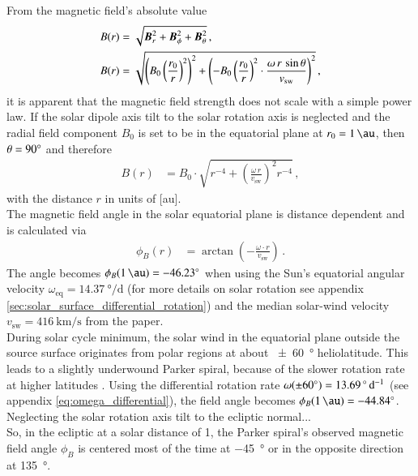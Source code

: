From the magnetic field's absolute value
\begin{align}
	B(r) &= \sqrt{\boldsymbol{B}_r^2 + \boldsymbol{B}_\phi^2 + \boldsymbol{B}_\theta^2}\,,	\label{eq:B_absolute}\\
	B(r) &= \sqrt{\left(B_0 \left(\frac{r_0}{r}\right)^2\right)^2 + \left(-B_0 \left(\frac{r_0}{r}\right)^2 \cdot \frac{\omega\,r\,\sin\theta}{v_\text{sw}}\right)^2}\,,
\end{align}
it is apparent that the magnetic field strength does not scale with a simple power law. If the solar dipole axis tilt to the solar rotation axis is neglected and the radial field component $B_0$ is set to be in the equatorial plane at $r_0 = \SI{1}{\au}$, then $\theta = 90\degree$ and therefore
\begin{align}
	B(r) &= B_0 \cdot \sqrt{r^{-4} + \left(\frac{\omega\,r}{v_\text{sw}}\right)^2 r^{-4}}\,,	\label{eq:B_1au}
\end{align}
with the distance $r$ in units of [au].\\

The magnetic field angle in the solar equatorial plane is distance dependent and is calculated via
\begin{align}
	\phi_B(r) &= \arctan\left(-\frac{\omega \cdot r}{v_\text{sw}}\right)\,.
\end{align}
The angle becomes $\phi_B(\SI{1}{\au}) = \SI{-46.23}{\degree}$ when using the Sun's equatorial angular velocity $\omega_\text{eq} = \SI{14.37}{\degree\per\day}$ (for more details on solar rotation see appendix \autoref{sec:solar_surface_differential_rotation}) and the median solar-wind velocity $v_\text{sw} = \SI{416}{\km\per\s}$ from the paper.\\

During solar cycle minimum, the solar wind in the equatorial plane outside the source surface originates from polar regions at about \SI{+-60}{\degree} heliolatitude. This leads to a slightly underwound Parker spiral, because of the slower rotation rate at higher latitudes \citep{Banaszkiewicz1998}. Using the differential rotation rate $\omega(\SI{+-60}{\degree}) = \SI{13.69}{\degree\per\day}$ (see appendix \autoref{eq:omega_differential}), the field angle becomes $\phi_B(\SI{1}{\au}) = \SI{-44.84}{\degree}$.\\

Neglecting the solar rotation axis tilt to the ecliptic normal...\\

So, in the ecliptic at a solar distance of \SI{1}{\au}, the Parker spiral's observed magnetic field angle $\phi_B$ is centered most of the time at \SI{-45}{\degree} or in the opposite direction at \SI{135}{\degree}.\\

